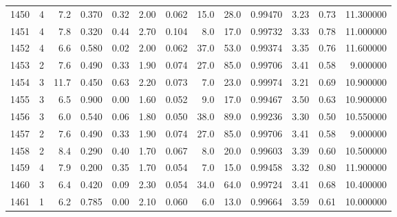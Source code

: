 \begin{tabular}{lrrrrrrrrrrrr}
1450 &        4 &            7.2 &             0.370 &         0.32 &            2.00 &      0.062 &                 15.0 &                  28.0 &  0.99470 &  3.23 &       0.73 &  11.300000 \\
1451 &        4 &            7.8 &             0.320 &         0.44 &            2.70 &      0.104 &                  8.0 &                  17.0 &  0.99732 &  3.33 &       0.78 &  11.000000 \\
1452 &        4 &            6.6 &             0.580 &         0.02 &            2.00 &      0.062 &                 37.0 &                  53.0 &  0.99374 &  3.35 &       0.76 &  11.600000 \\
1453 &        2 &            7.6 &             0.490 &         0.33 &            1.90 &      0.074 &                 27.0 &                  85.0 &  0.99706 &  3.41 &       0.58 &   9.000000 \\
1454 &        3 &           11.7 &             0.450 &         0.63 &            2.20 &      0.073 &                  7.0 &                  23.0 &  0.99974 &  3.21 &       0.69 &  10.900000 \\
1455 &        3 &            6.5 &             0.900 &         0.00 &            1.60 &      0.052 &                  9.0 &                  17.0 &  0.99467 &  3.50 &       0.63 &  10.900000 \\
1456 &        3 &            6.0 &             0.540 &         0.06 &            1.80 &      0.050 &                 38.0 &                  89.0 &  0.99236 &  3.30 &       0.50 &  10.550000 \\
1457 &        2 &            7.6 &             0.490 &         0.33 &            1.90 &      0.074 &                 27.0 &                  85.0 &  0.99706 &  3.41 &       0.58 &   9.000000 \\
1458 &        2 &            8.4 &             0.290 &         0.40 &            1.70 &      0.067 &                  8.0 &                  20.0 &  0.99603 &  3.39 &       0.60 &  10.500000 \\
1459 &        4 &            7.9 &             0.200 &         0.35 &            1.70 &      0.054 &                  7.0 &                  15.0 &  0.99458 &  3.32 &       0.80 &  11.900000 \\
1460 &        3 &            6.4 &             0.420 &         0.09 &            2.30 &      0.054 &                 34.0 &                  64.0 &  0.99724 &  3.41 &       0.68 &  10.400000 \\
1461 &        1 &            6.2 &             0.785 &         0.00 &            2.10 &      0.060 &                  6.0 &                  13.0 &  0.99664 &  3.59 &       0.61 &  10.000000 \\

\end{tabular}
